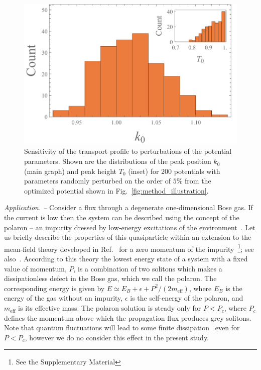 \documentclass[twocolumn,amsmath,amssymb,showpacs,prl,superscriptaddress,aps]{revtex4-1}
\begin{document}
\begin{figure}
   \includegraphics[width=1\linewidth]{figures/plot_sensitivity.pdf}
 \caption[Sensitivity Plot]{Sensitivity of the transport profile to perturbations of the potential parameters. Shown are the distributions of the peak position $k_0$ (main graph) and peak height $T_0$ (inset) for 200 potentials with parameters randomly perturbed on the order of $5\%$ from the optimized potential shown in Fig.~\ref{fig:method_illustration}. }
 \label{fig:sensitivity}
\end{figure}



{\it Application. --} Consider a flux through a degenerate 
one-dimensional Bose gas. If the current is low then the system 
can be described using the concept of the polaron -- an impurity dressed by low-energy excitations 
of the environment~\cite{landau1948}. Let us briefly describe the properties of this quasiparticle
within an extension to the mean-field theory developed in Ref.~\cite{volosniev2017}
for a zero momentum of the impurity~\footnote{See the Supplementary Material}; see also~\cite{kain2016, parisi2017,grusdt2017, pastukhov2017}. 
According to this theory the lowest energy state of a system with a fixed value of momentum, $P$, 
is a combination of two solitons which makes a dissipationless defect in the Bose gas, which we call the polaron. The corresponding energy 
is given by $E\simeq E_B+\epsilon+P^2/(2m_{\mathrm{eff}})$, where $E_B$ is the energy of the gas without an impurity, 
$\epsilon$ is the self-energy of the polaron, and $m_{\mathrm{eff}}$ is its effective mass. The polaron solution is steady only 
for $P<P_c$, where $P_c$ defines the momentum above which the propagation flux produces grey solitons. 
Note that quantum fluctuations will lead to some finite dissipation~\cite{astrakharchik2004,sykes2009} even for $P<P_c$, however
we do no consider this effect in the present study.
\end{document}
